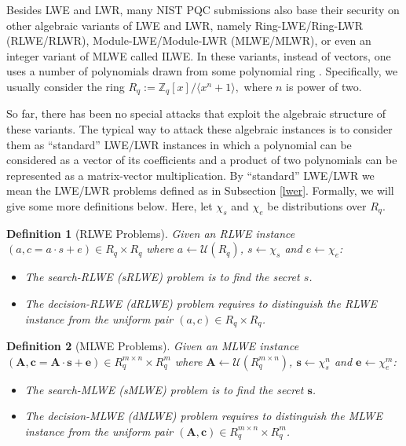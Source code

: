 \documentclass{cta-author}
\newtheorem{definition}{Definition}{}
\begin{document}
Besides LWE and LWR, many NIST PQC submissions also base their security on other algebraic variants of LWE and LWR, namely Ring-LWE/Ring-LWR (RLWE/RLWR), Module-LWE/Module-LWR (MLWE/MLWR), or even an integer variant of MLWE called ILWE.
 In these variants, instead of vectors, one uses a number of polynomials drawn from some polynomial ring \cite{LPR10}. Specifically, we usually consider the ring $R_q:=\mathbb{Z}_q[x]/ \langle x^n+1\rangle,$ where $n$ is power of two. 

 So far, there has been no special attacks that exploit the algebraic structure of these variants. The typical way to attack these algebraic instances is to consider them as ``standard'' LWE/LWR instances in which a polynomial can be considered as a vector of its coefficients and a product of two polynomials can be represented as a matrix-vector multiplication. By ``standard'' LWE/LWR we mean the LWE/LWR problems defined as in Subsection \ref{lwer}.
Formally, we will give some more definitions below. Here, let $\chi_s$ and $\chi_e$ be distributions over $R_q$. 
\begin{definition}[RLWE Problems]
	Given an RLWE  instance $(a,c=a \cdot s+e) \in  R_q \times  R_q$ where $a \leftarrow \mathcal{U}(R_q)$, $s \leftarrow \chi_s$ and $e \leftarrow \chi_e$:
	\begin{itemize}
		\item The search-RLWE (sRLWE) problem is to find the secret $s$.
		\item The decision-RLWE (dRLWE) problem requires to distinguish the RLWE instance  from the uniform pair $(a,c)\in  R_q \times  R_q$.
	\end{itemize}
\end{definition}


\begin{definition}[MLWE Problems]
	Given an MLWE instance $(\mathbf{A},\mathbf{c}=\mathbf{A} \cdot \mathbf{s}+\mathbf{e}) \in  R_q^{m\times n} \times  R_q^{m}$ where $\mathbf{A} \leftarrow \mathcal{U}(R_q^{m \times n})$, $\mathbf{s} \leftarrow \chi_s^n$ and $\mathbf{e} \leftarrow \chi_e^m$:
	\begin{itemize}
		\item The search-MLWE (sMLWE) problem is to find the secret $\mathbf{s}$.
		\item The decision-MLWE (dMLWE) problem requires to distinguish the MLWE instance  from the uniform pair $(\mathbf{A},\mathbf{c}) \in  R_q^{m\times n} \times  R_q^{m}$.
	\end{itemize}
\end{definition}
	 
\end{document}
